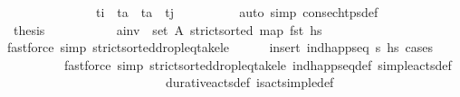 \begin{isabellebody}
\ \ \ \ \ \ \ \ \ \ \ \ \ \ {\isacartoucheopen}t\isactrlsub i{\isacharprime}{\kern0pt}\ {\isacharless}{\kern0pt}\ t\isactrlsub a{\isacharprime}{\kern0pt}\ {\isasymand}\ t\isactrlsub a{\isacharprime}{\kern0pt}\ {\isacharless}{\kern0pt}\ t\isactrlsub j{\isacharprime}{\kern0pt}{\isacartoucheclose}\isanewline
\ \ \ \ \ \ \ \ \isamarkupfalse%
\ {\isacharparenleft}{\kern0pt}auto\ simp{\isacharcolon}{\kern0pt}\ consec{\isacharunderscore}{\kern0pt}htps{\isacharunderscore}{\kern0pt}def{\isacharparenright}{\kern0pt}\isanewline
\ \ \ \ \ \ \isamarkupfalse%
\ \isamarkupfalse%
\ {\isacharquery}{\kern0pt}thesis\isanewline
\ \ \ \ \ \ \ \ \isamarkupfalse%
\ {}\ {\isacartoucheopen}{\isacharquery}{\kern0pt}a\isactrlsub i\isactrlsub n\isactrlsub v\ {\isasymin}\ set\ A{\isacharprime}{\kern0pt}{\isacartoucheclose}\ {\isacartoucheopen}strict{\isacharunderscore}{\kern0pt}sorted\ {\isacharparenleft}{\kern0pt}map\ fst\ hs\isanewline
\ \ \ \ \ \ \ \ \isamarkupfalse%
{\isacharparenleft}{\kern0pt}fastforce\ simp{\isacharcolon}{\kern0pt}\ strict{\isacharunderscore}{\kern0pt}sorted{\isacharunderscore}{\kern0pt}drop{\isacharunderscore}{\kern0pt}leq{\isacharunderscore}{\kern0pt}take{\isacharunderscore}{\kern0pt}le{\isacharprime}{\kern0pt}{\isacharparenright}{\kern0pt}\isanewline
\ \ \ \ \isamarkupfalse%
\ {\isacharparenleft}{\kern0pt}insert\ {\isacartoucheopen}ind{\isacharunderscore}{\kern0pt}happ{\isacharunderscore}{\kern0pt}seq\ {\isasympi}s\ hs\ cases\ {\isasympi}{\isacharsemicolon}{\kern0pt}\isanewline
\ \ \ \ \ \ \ \ \ fastforce\ simp{\isacharcolon}{\kern0pt}\ strict{\isacharunderscore}{\kern0pt}sorted{\isacharunderscore}{\kern0pt}drop{\isacharunderscore}{\kern0pt}leq{\isacharunderscore}{\kern0pt}take{\isacharunderscore}{\kern0pt}le{\isacharprime}{\kern0pt}\ ind{\isacharunderscore}{\kern0pt}happ{\isacharunderscore}{\kern0pt}seq{\isacharunderscore}{\kern0pt}def\ simple{\isacharunderscore}{\kern0pt}acts{\isacharunderscore}{\kern0pt}def\isanewline
\ \ \ \ \ \ \ \ \ \ \ \ \ \ \ \ \ \ \ \ \ \ \ \ \ durative{\isacharunderscore}{\kern0pt}acts{\isacharunderscore}{\kern0pt}def\ is{\isacharunderscore}{\kern0pt}act{\isacharunderscore}{\kern0pt}simple{\isacharunderscore}{\kern0pt}def{\isacharparenright}{\kern0pt}{\isacharplus}{\kern0pt}\isanewline
\ \ \isamarkupfalse%
%
\endisatagproof
{\isafoldproof}%

\end{isabellebody}
